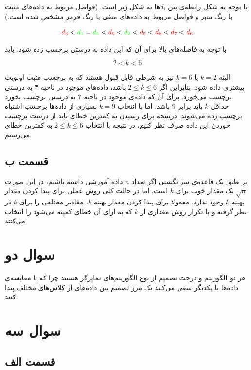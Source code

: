 \documentclass{article}
\begin{document}
با توجه به شکل رابطه‌‌ی بین $d_i$ها به شکل زیر است. (فواصل مربوط به داده‌های مثبت با رنگ سبز
و فواصل مربوط به داده‌های منفی با رنگ قرمز مشخص شده است.)

$$\textcolor{red}{d_3} < \textcolor{green}{d_1} = \textcolor{green}{d_4} < \textcolor{red}{d_9} <
\textcolor{green}{d_2} < \textcolor{red}{d_5} < \textcolor{red}{d_8} < \textcolor{red}{d_7} < \textcolor{red}{d_6} $$

با توجه به فاصله‌های بالا برای آن‌ که این داده به درستی برچسب زده شود، باید

$$2 < k < 6$$

البته $k=2$ یا $k=6$ نیز به شرطی قابل قبول هستند که به برچسب مثبت اولویت بیشتری داده شود.
بنابراین اگر $2 \leq k \leq 6$ باشد، داده‌های موجود در ناحیه ۳ به درستی برچسب می‌خورد. برای آن که
داده‌ی موجود در ناحیه ۲ به درستی برچسب بخورد حداقل $k$ باید برابر 9 باشد. اما با انتخاب $k=9$
بسیاری از داده‌ها برچسب اشتباه برچسب زده می‌شوند. درنتیجه برای رسیدن به کمترین خطای 
باید از درست‌ برچسب خوردن این داده صرف نظر کنیم، در نتیجه با انتخاب $2 \leq k \leq 6$ به کمترین
خطای  می‌رسیم.

\subsection*{قسمت ب}

بر طبق یک قاعده‌ی سرانگشتی اگر تعداد $n$ داده آموزشی داشته باشیم، در این صورت
$\sqrt{n}$ یک مقدار خوب برای $k$ است. اما در حالت کلی روش عملی برای پیدا کردن مقدار بهینه $k$ وجود ندارد.
معمولا برای پیدا کردن مقدار بهینه $k$، مقادیر مختلفی را برای $k$ در نظر گرفته و با تکرار روش 
مقداری از $k$ که به ازای آن خطای کمینه می‌شود را انتخاب می‌کنند.

\section*{سوال دو}

هر دو الگوریتم  و درخت تصمیم از نوع الگوریتم‌های تمایزگر هستند چرا که با مقایسه‌ی داده‌ها با یکدیگر
سعی می‌کنند یک مرز تصمیم بین داده‌های از کلاس‌های مختلف پیدا کنند.

\section*{سوال سه}

\subsection*{قسمت الف}
\end{document}
